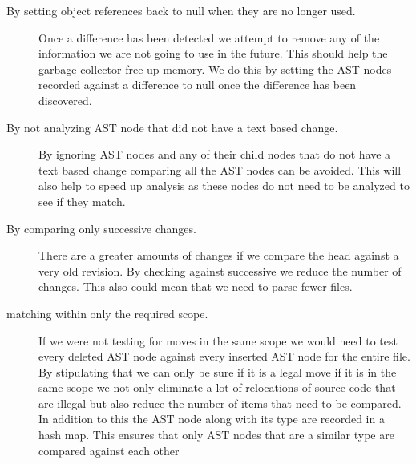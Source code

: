 \begin{description}
 \item [By setting object references back to null when they are no longer used.]
  Once a difference has been detected we attempt to remove any of the information we are not going to use in the future.  This should help the garbage collector free up memory. We do this by setting the AST nodes recorded against a difference to null once the difference has been discovered. 
\item [By not analyzing AST node that did not have a text based change.] 
  By ignoring AST nodes and any of their child nodes that do not have a text based change comparing all the AST nodes can be avoided.  This will also help to speed up analysis as these nodes do not need to be analyzed to see if they match.
\item [By comparing only successive changes.] 
  There are a greater amounts of changes if we compare the head against a very old revision. By checking against successive we reduce the number of changes. This also could mean that we need to parse fewer files.
\item [matching within only the required scope.]
  If we were not testing for moves in the same scope we would need to test every deleted AST node against every inserted AST node for the entire file. By stipulating that we can only be sure if it is a legal move if it is in the same scope we not only eliminate a lot of relocations of source code that are illegal but also reduce the number of items that need to be compared. In addition to this the AST node along with its type are recorded in a hash map.  This ensures that only AST nodes that are a similar type are compared against each other

\end{description}


